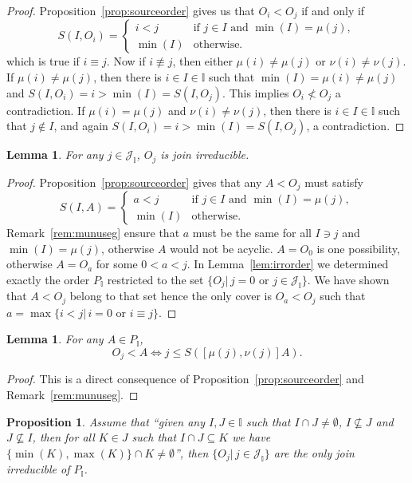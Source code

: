 \documentclass[reqno]{amsart}
\newtheorem{proposition}[theorem]{Proposition}
\newtheorem{lemma}[theorem]{Lemma}
\theoremstyle{definition}
\newcommand{\II}{\mathbb I} %
\newcommand{\cJ}{\mathcal J} %
\begin{document}
\begin{proof} Proposition~\ref{prop:sourceorder} gives us that $O_i<O_j$ if and only if
 	$$ S(I,O_i)=\begin{cases}
		i<j & \text{if $j\in I$ and $\min(I)=\mu(j)$},\\
		\min(I)& \text{otherwise.}
	\end{cases}$$
which is true if $i\equiv j$. Now if $i\not\equiv j$, then either $\mu(i)\ne \mu(j)$  or  $\nu(i)\ne \nu(j)$.
If $\mu(i)\ne\mu(j)$, then there is $i\in I\in \II$ such that $\min(I)=\mu(i)\ne\mu(j)$ and
  $S(I,O_i)=i>\min(I)=S(I,O_j)$. This implies $O_i\not<O_j$ a contradiction. If $\mu(i)= \mu(j)$  and  $\nu(i)\ne \nu(j)$,
  then there is $i\in I\in \II$ such that $j\not\in I$, and again $S(I,O_i)=i>\min(I)=S(I,O_j)$, a contradiction.
\end{proof} 

\begin{lemma}\label{lem:irrOj}
	For any $j\in \cJ_\II$, $O_j$ is join irreducible.
\end{lemma}

\begin{proof} Proposition~\ref{prop:sourceorder} gives that any $A<O_j$ must satisfy
 	$$ S(I,A)=\begin{cases}
		a<j & \text{if $j\in I$ and $\min(I)=\mu(j)$},\\
		\min(I)& \text{otherwise.}
	\end{cases}$$
Remark~\ref{rem:munuseg} ensure that $a$ must be the same for all $I\ni j$ and $\min(I)=\mu(j)$, otherwise $A$ would not be acyclic.
$A=O_0$ is one possibility, otherwise $A=O_a$ for some $0<a<j$. In Lemma~\ref{lem:irrorder} we determined exactly the order $P_\II$ restricted
to the set $\{ O_j |\, j=0 \text{ or } j\in \cJ_\II\}$. We have shown  that $A<O_j$ belong to that set hence the only cover is $O_a<O_j$
such that $a=\max\{ i<j|\, i=0 \text{ or } i\equiv j\}$.
\end{proof}

\begin{lemma}\label{lem:subirr}
	For any $A\in P_\II$,
	 $$ O_j<A \iff j\le S([\mu(j),\nu(j)] A). $$
\end{lemma}

\begin{proof}
This is a direct consequence of Proposition~\ref{prop:sourceorder} and Remark~\ref{rem:munuseg}.
\end{proof}

\begin{proposition} Assume that
 ``given any $I,J\in \II$ such that $I\cap J\ne \emptyset$, $I\not\subseteq J$ and $J\not\subseteq I$,
 then for all $K\in J$ such that  $I\cap J\subseteq K$ we have $\{\min(K),\max(K)\}\cap K\ne \emptyset$'',
 then $\{O_j|\,j\in \cJ_\II\}$ are the only join irreducible of $P_\II$. 
\end{proposition}
\end{document}
